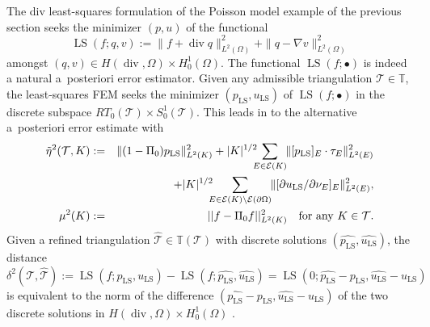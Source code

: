 \documentclass{siamltex1213}
\begin{document}
The div least-squares formulation  \cite{BG09} of the Poisson model example of the previous section seeks 
the minimizer  $(p,u)$ of the functional
\begin{equation*}
	\operatorname{LS}(f; q,v):=
	\|f+\operatorname{div}q\|_{L^2(\Omega)}^2+\|q -\nabla v\|_{L^2(\Omega)}^2
\end{equation*}
amongst $(q,v)\in H(\operatorname{div},\Omega)\times H^1_0(\Omega)$. The functional $\operatorname{LS}(f;\bullet)$ is indeed a natural a~posteriori error estimator. Given any admissible triangulation ${\mathcal{T}}\in{\mathbb T}$,
the least-squares FEM seeks the minimizer
$({p_{\operatorname{LS}}},{u_{\operatorname{LS}}})$ of $\operatorname{LS}(f;\bullet)$ in the discrete subspace $RT_0({\mathcal{T}})\times S^1_0({\mathcal{T}})$. 
This leads in \cite{CCP-lsfem} 
to the alternative a~posteriori error estimate with
\begin{eqnarray}  \label{eq:estimatorls}
\tilde \eta^2({\mathcal{T}},K)&:=& \|(1-\Pi_0){p_{\operatorname{LS}}} \|^2_{L^2(K)}
+|K|^{{1}/{2}} \hspace{-2mm}
\sum_{E\in\operatorname{\mathcal{E}}(K)} \hspace{-1mm} \| [ {p_{\operatorname{LS}}}  ]_E \cdot \tau_E \|_{L^2(E)}^2\\  \nonumber
&& + |K|^{{1}/{2}}\hspace{-2mm} \sum_{E\in\operatorname{\mathcal{E}}(K)\setminus\operatorname{\mathcal{E}}(\partial\Omega)}\hspace{-1mm}
\| [ \partial {u_{\operatorname{LS}}} /\partial \nu_E]_E \|_{L^2(E)}^2, \\
\mu^2(K)&:=&|| f-\Pi_0 f||^2_{L^2(K)}\quad\text{for any }K\in{\mathcal{T}}.  \label{eq:muls}
\end{eqnarray}
Given a refined triangulation ${\hat{\mathcal{T}}}\in{\mathbb T}({\mathcal{T}})$ with discrete solutions 
$(\widehat{p_{\operatorname{LS}}},\widehat{u_{\operatorname{LS}}})$, the distance 
\[
\delta^2({\mathcal{T}},{\hat{\mathcal{T}}}):= \operatorname{LS}(f; {p_{\operatorname{LS}}},{u_{\operatorname{LS}}})- \operatorname{LS}(f; \widehat{p_{\operatorname{LS}}},\widehat{u_{\operatorname{LS}}})
=\operatorname{LS}(0; \widehat{p_{\operatorname{LS}}}-{p_{\operatorname{LS}}},\widehat{u_{\operatorname{LS}}}-{u_{\operatorname{LS}}})\]
is equivalent to the norm of the difference $(\widehat{p_{\operatorname{LS}}}-{p_{\operatorname{LS}}}, \widehat{u_{\operatorname{LS}}} -{u_{\operatorname{LS}}})$ of the two discrete solutions
in $H(\operatorname{div},\Omega)\times H^1_0(\Omega)$ \cite{BG09}.
\end{document}
